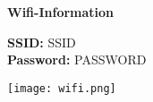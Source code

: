 \documentclass[12pt, a6paper, DIV12, final]{scrreprt}
\begin{document}
\center

\huge
\textbf{Wifi-Information}

\bigskip
\bigskip

\normalsize

\textbf{SSID:} {{ SSID }} \\
\medskip
\textbf{Password:} {{ PASSWORD }}

\texttt{[image: wifi.png]}
\end{document}
